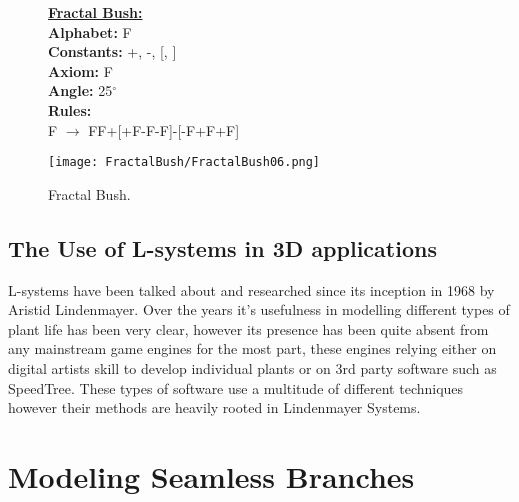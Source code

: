 \begin{figure}[htbp]
	\raggedright
	\textbf{\underline{Fractal Bush:}} \\
	\textbf{Alphabet:} F\\
	\textbf{Constants:} +, -, [, ] \\
	\textbf{Axiom:} F \\
	\textbf{Angle:} 25$^\circ$ \\
	\textbf{Rules:} \\
	F $\rightarrow$ FF+[+F-F-F]-[-F+F+F]\\
	{\centering
		\vspace{7px}
		\texttt{[image: FractalBush/FractalBush06.png]}
		\caption{Fractal Bush.}
	}
\end{figure}

\FloatBarrier

\subsection{The Use of L-systems in 3D applications}

\begin{flushleft}

L-systems have been talked about and researched since its inception in 1968 by Aristid Lindenmayer. Over the years it's usefulness in modelling different types of plant life has been very clear, however its presence has been quite absent from any mainstream game engines for the most part, these engines relying either on digital artists skill to develop individual plants or on 3rd party software such as SpeedTree. These types of software use a multitude of different techniques however their methods are heavily rooted in Lindenmayer Systems. 

\end{flushleft}


\section{Modeling Seamless Branches}

